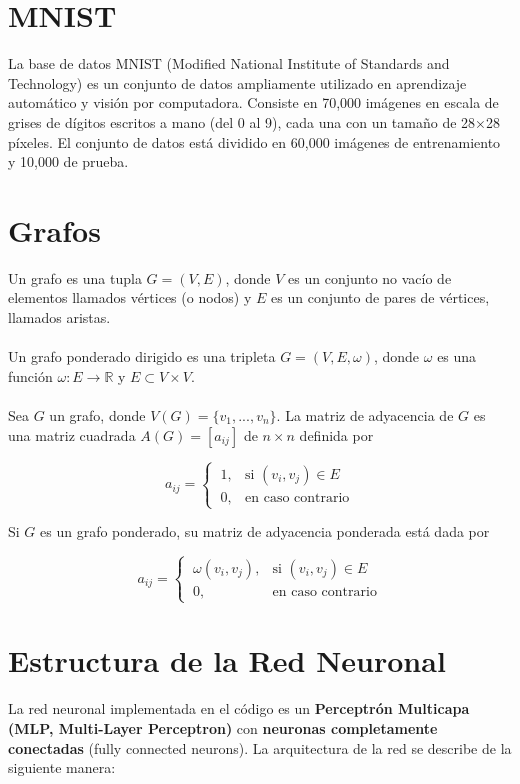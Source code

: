 \documentclass{article}
\begin{document}
\section{MNIST}

La base de datos MNIST (Modified National Institute of Standards and Technology) es un conjunto de datos ampliamente utilizado en aprendizaje automático y visión por computadora. Consiste en 70,000 imágenes en escala de grises de dígitos escritos a mano (del 0 al 9), cada una con un tamaño de 28×28 píxeles. El conjunto de datos está dividido en 60,000 imágenes de entrenamiento y 10,000 de prueba.  

\section{Grafos}

Un grafo es una tupla $G = (V, E)$, donde $V$ es un conjunto no vacío de elementos llamados vértices (o nodos) y $E$ es un conjunto de pares de vértices, llamados aristas.\\
\\
Un grafo ponderado dirigido es una tripleta $G = (V, E, \omega)$, donde $\omega$ es una función $\omega: E \rightarrow \mathbb{R}$ y $E \subset V \times V$.\\
\\
Sea $G$ un grafo, donde $V(G) = \lbrace v_1, ..., v_n \rbrace$. La matriz de adyacencia de $G$ es una matriz cuadrada $A(G) = [a_{ij}]$ de $n \times n$ definida por

\[
a_{ij} =
\begin{cases} 
\ 1, & \text{si } ( v_i , v_j) \in E \\
\ 0, & \text{en caso contrario}
\end{cases}
\]

Si $G$ es un grafo ponderado, su matriz de adyacencia ponderada está dada por

\[
a_{ij} =
\begin{cases} 
\ \omega( v_i , v_j), & \text{si } (v_i , v_j) \in E \\
\ 0, & \text{en caso contrario}
\end{cases}
\]

\section{Estructura de la Red Neuronal}

La red neuronal implementada en el código es un \textbf{Perceptrón Multicapa (MLP, Multi-Layer Perceptron)} con \textbf{neuronas completamente conectadas} (fully connected neurons). La arquitectura de la red se describe de la siguiente manera:
\end{document}
